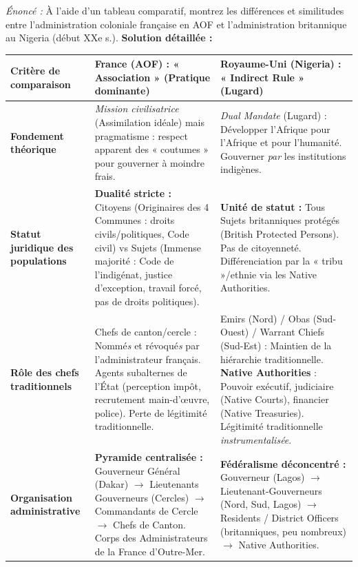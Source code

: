 \documentclass[11pt]{article}
\newcommand{\cle}[1]{{\popxbold\color{popdark}#1}}
\begin{document}
\begin{exoresolu}
\emph{Énoncé :} À l'aide d'un tableau comparatif, montrez les différences et similitudes entre l'administration coloniale française en AOF et l'administration britannique au Nigeria (début XXe s.).
\tcblower
\textbf{Solution détaillée :}

\begin{center}
\begin{tabularx}{\linewidth}{|l|X|X|}
\hline
\rowcolor{popblueL}
\textbf{Critère de comparaison} & \textbf{France (AOF) : « Association » (Pratique dominante)} & \textbf{Royaume-Uni (Nigeria) : « Indirect Rule » (Lugard)} \\
\hline
\textbf{Fondement théorique} & \emph{Mission civilisatrice} (Assimilation idéale) mais pragmatisme : respect apparent des « coutumes » pour gouverner à moindre frais. & \emph{Dual Mandate} (Lugard) : Développer l'Afrique pour l'Afrique et pour l'humanité. Gouverner \emph{par} les institutions indigènes. \\
\hline
\textbf{Statut juridique des populations} & \textbf{Dualité stricte :} \cle{Citoyens} (Originaires des 4 Communes : droits civils/politiques, Code civil) vs \cle{Sujets} (Immense majorité : Code de l'indigénat, justice d'exception, travail forcé, pas de droits politiques). & \textbf{Unité de statut :} Tous \cle{Sujets britanniques protégés} (British Protected Persons). Pas de citoyenneté. Différenciation par la « tribu »/ethnie via les \cle{Native Authorities}. \\
\hline
\textbf{Rôle des chefs traditionnels} & \cle{Chefs de canton/cercle} : Nommé\emph{s} et révoqué\emph{s} par l'administrateur français. Agents subalternes de l'État (perception impôt, recrutement main-d'œuvre, police). Perte de légitimité traditionnelle. & \cle{Emirs (Nord) / Obas (Sud-Ouest) / Warrant Chiefs (Sud-Est)} : Maintien de la hiérarchie traditionnelle. \textbf{Native Authorities} : Pouvoir exécutif, judiciaire (Native Courts), financier (Native Treasuries). Légitimité traditionnelle \emph{instrumentalisée}. \\
\hline
\textbf{Organisation administrative} & \textbf{Pyramide centralisée :} Gouverneur Général (Dakar) $\to$ Lieutenants Gouverneurs (Cercles) $\to$ Commandants de Cercle $\to$ Chefs de Canton. Corps des \cle{Administrateurs de la France d'Outre-Mer}. & \textbf{Fédéralisme déconcentré :} Gouverneur (Lagos) $\to$ Lieutenant-Gouverneurs (Nord, Sud, Lagos) $\to$ \cle{Residents / District Officers} (britanniques, peu nombreux) $\to$ \cle{Native Authorities}. \\

\end{tabularx}
\end{center}
\end{exoresolu}
\end{document}
